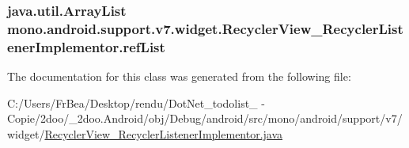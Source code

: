 \hypertarget{classmono_1_1android_1_1support_1_1v7_1_1widget_1_1_recycler_view___recycler_listener_implementor_63a1dcf6ee5657adb40e147518c02d5b}{
\subsubsection[{refList}]{\setlength{\rightskip}{0pt plus 5cm}java.util.ArrayList {\bf mono.android.support.v7.widget.RecyclerView\_\-RecyclerListenerImplementor.refList}}}
\label{classmono_1_1android_1_1support_1_1v7_1_1widget_1_1_recycler_view___recycler_listener_implementor_63a1dcf6ee5657adb40e147518c02d5b}




The documentation for this class was generated from the following file:\begin{CompactItemize}
\item 
C:/Users/FrBea/Desktop/rendu/DotNet\_\-todolist\_ - Copie/2doo/\_\-2doo.Android/obj/Debug/android/src/mono/android/support/v7/widget/\hyperlink{_recycler_view___recycler_listener_implementor_8java}{RecyclerView\_\-RecyclerListenerImplementor.java}\end{CompactItemize}
